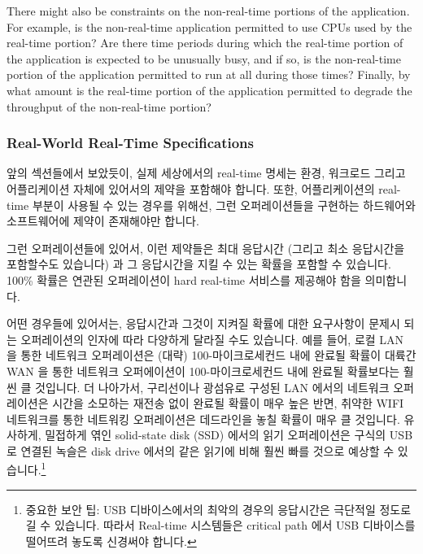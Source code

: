 There might also be constraints on the non-real-time portions of the
application.
For example, is the non-real-time application permitted to use CPUs used
by the real-time portion?
Are there time periods during which the real-time portion of the application
is expected to be unusually busy, and if so, is the non-real-time portion
of the application permitted to run at all during those times?
Finally, by what amount is the real-time portion of the application permitted
to degrade the throughput of the non-real-time portion?
\fi

\subsubsection{Real-World Real-Time Specifications}
\label{sec:rt:Real-World Real-Time Specifications}

앞의 섹션들에서 보았듯이, 실제 세상에서의 real-time 명세는 환경, 워크로드
그리고 어플리케이션 자체에 있어서의 제약을 포함해야 합니다.
또한, 어플리케이션의 real-time 부분이 사용될 수 있는 경우를 위해선, 그런
오퍼레이션들을 구현하는 하드웨어와 소프트웨어에 제약이 존재해야만 합니다.

그런 오퍼레이션들에 있어서, 이런 제약들은 최대 응답시간 (그리고 최소 응답시간을
포함할수도 있습니다) 과 그 응답시간을 지킬 수 있는 확률을 포함할 수 있습니다.
100\% 확률은 연관된 오퍼레이션이 hard real-time 서비스를 제공해야 함을
의미합니다.

어떤 경우들에 있어서는, 응답시간과 그것이 지켜질 확률에 대한 요구사항이 문제시
되는 오퍼레이션의 인자에 따라 다양하게 달라질 수도 있습니다.
예를 들어, 로컬 LAN 을 통한 네트워크 오퍼레이션은 (대략) 100-마이크로세컨드
내에 완료될 확률이 대륙간 WAN 을 통한 네트워크 오퍼에이션이 100-마이크로세컨드
내에 완료될 확률보다는 훨씬 클 것입니다.
더 나아가서, 구리선이나 광섬유로 구성된 LAN 에서의 네트워크 오퍼레이션은 시간을
소모하는 재전송 없이 완료될 확률이 매우 높은 반면, 취약한 WIFI 네트워크를 통한
네트워킹 오퍼레이션은 데드라인을 놓칠 확률이 매우 클 것입니다.
유사하게, 밀접하게 엮인 solid-state disk (SSD) 에서의 읽기 오퍼레이션은 구식의
USB 로 연결된 녹슬은 disk drive 에서의 같은 읽기에 비해 훨씬 빠를 것으로 예상할
수 있습니다.\footnote{
	중요한 보안 팁: USB 디바이스에서의 최악의 경우의 응답시간은 극단적일
	정도로 길 수 있습니다.
	따라서 Real-time 시스템들은 critical path 에서 USB 디바이스를 떨어뜨려
	놓도록 신경써야 합니다.}
\iffalse

